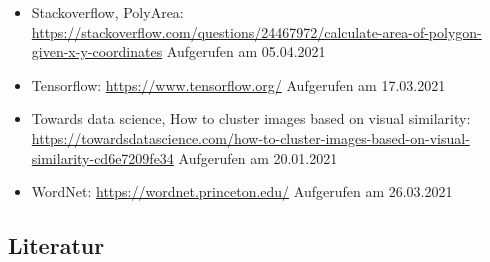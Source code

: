 \documentclass[a4paper,12pt,ngerman]{article}
\begin{document}
\begin{itemize}
\item Stackoverflow, PolyArea: \newline \href{https://stackoverflow.com/questions/24467972/calculate-area-of-polygon-given-x-y-coordinates}{https://stackoverflow.com/questions/24467972/calculate-area-of-polygon-given-x-y-coordinates} \newline Aufgerufen am 05.04.2021
\item Tensorflow: \newline \href{https://www.tensorflow.org/}{https://www.tensorflow.org/} \newline Aufgerufen am 17.03.2021
\item Towards data science, How to cluster images based on visual similarity: \newline \href{https://towardsdatascience.com/how-to-cluster-images-based-on-visual-similarity-cd6e7209fe34}{https://towardsdatascience.com/how-to-cluster-images-based-on-visual-similarity-cd6e7209fe34} \newline Aufgerufen am 20.01.2021
\item WordNet: \newline \href{https://wordnet.princeton.edu/}{https://wordnet.princeton.edu/} \newline Aufgerufen am 26.03.2021
\end{itemize}

\subsection{Literatur}
\end{document}
